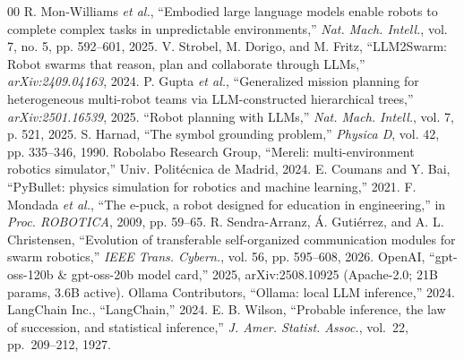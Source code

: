 \documentclass[conference]{IEEEtran}
\begin{document}
\begin{thebibliography}{00}
 R. Mon-Williams \emph{et al.}, ``Embodied large language models enable robots to complete complex tasks in unpredictable environments,'' \emph{Nat. Mach. Intell.}, vol. 7, no. 5, pp. 592--601, 2025.
 V. Strobel, M. Dorigo, and M. Fritz, ``LLM2Swarm: Robot swarms that reason, plan and collaborate through LLMs,'' \emph{arXiv:2409.04163}, 2024.
 P. Gupta \emph{et al.}, ``Generalized mission planning for heterogeneous multi-robot teams via LLM-constructed hierarchical trees,'' \emph{arXiv:2501.16539}, 2025.
 ``Robot planning with LLMs,'' \emph{Nat. Mach. Intell.}, vol. 7, p. 521, 2025.
 S. Harnad, ``The symbol grounding problem,'' \emph{Physica D}, vol. 42, pp. 335--346, 1990.
 Robolabo Research Group, ``Mereli: multi-environment robotics simulator,'' Univ. Polit\'ecnica de Madrid, 2024.
 E. Coumans and Y. Bai, ``PyBullet: physics simulation for robotics and machine learning,'' 2021.
 F. Mondada \emph{et al.}, ``The e-puck, a robot designed for education in engineering,'' in \emph{Proc. ROBOTICA}, 2009, pp. 59--65.
 R. Sendra-Arranz, \'A. Guti\'errez, and A. L. Christensen, ``Evolution of transferable self-organized communication modules for swarm robotics,'' \emph{IEEE Trans. Cybern.}, vol. 56, pp. 595--608, 2026.
 OpenAI, ``gpt-oss-120b \& gpt-oss-20b model card,'' 2025, arXiv:2508.10925 (Apache-2.0; 21B params, 3.6B active).
 Ollama Contributors, ``Ollama: local LLM inference,'' 2024.
 LangChain Inc., ``LangChain,'' 2024.
 E. B. Wilson, ``Probable inference, the law of succession, and statistical inference,'' \emph{J. Amer. Statist. Assoc.}, vol.~22, pp.~209--212, 1927.
\end{thebibliography}
\end{document}
